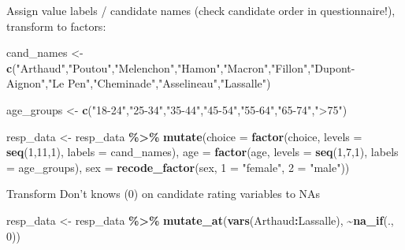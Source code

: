 \documentclass[
]{article}
\newenvironment{Shaded}{\begin{snugshade}}{\end{snugshade}}
\newcommand{\AttributeTok}[1]{\textcolor[rgb]{0.13,0.29,0.53}{#1}}
\newcommand{\DecValTok}[1]{\textcolor[rgb]{0.00,0.00,0.81}{#1}}
\newcommand{\FunctionTok}[1]{\textcolor[rgb]{0.13,0.29,0.53}{\textbf{#1}}}
\newcommand{\NormalTok}[1]{#1}
\newcommand{\OtherTok}[1]{\textcolor[rgb]{0.56,0.35,0.01}{#1}}
\newcommand{\SpecialCharTok}[1]{\textcolor[rgb]{0.81,0.36,0.00}{\textbf{#1}}}
\newcommand{\StringTok}[1]{\textcolor[rgb]{0.31,0.60,0.02}{#1}}
\begin{document}
Assign value labels / candidate names (check candidate order in
questionnaire!), transform to factors:

\begin{Shaded}
\begin{Highlighting}[]
\NormalTok{cand\_names }\OtherTok{\textless{}{-}} \FunctionTok{c}\NormalTok{(}\StringTok{"Arthaud"}\NormalTok{,}\StringTok{"Poutou"}\NormalTok{,}\StringTok{"Melenchon"}\NormalTok{,}\StringTok{"Hamon"}\NormalTok{,}\StringTok{"Macron"}\NormalTok{,}\StringTok{"Fillon"}\NormalTok{,}\StringTok{"Dupont{-}Aignon"}\NormalTok{,}\StringTok{"Le Pen"}\NormalTok{,}\StringTok{"Cheminade"}\NormalTok{,}\StringTok{"Asselineau"}\NormalTok{,}\StringTok{"Lassalle"}\NormalTok{)}

\NormalTok{age\_groups }\OtherTok{\textless{}{-}} \FunctionTok{c}\NormalTok{(}\StringTok{"18{-}24"}\NormalTok{,}\StringTok{"25{-}34"}\NormalTok{,}\StringTok{"35{-}44"}\NormalTok{,}\StringTok{"45{-}54"}\NormalTok{,}\StringTok{"55{-}64"}\NormalTok{,}\StringTok{"65{-}74"}\NormalTok{,}\StringTok{"\textgreater{}75"}\NormalTok{)}

\NormalTok{resp\_data }\OtherTok{\textless{}{-}}\NormalTok{ resp\_data }\SpecialCharTok{\%\textgreater{}\%} \FunctionTok{mutate}\NormalTok{(}\AttributeTok{choice =} \FunctionTok{factor}\NormalTok{(choice, }\AttributeTok{levels =} \FunctionTok{seq}\NormalTok{(}\DecValTok{1}\NormalTok{,}\DecValTok{11}\NormalTok{,}\DecValTok{1}\NormalTok{), }\AttributeTok{labels =}\NormalTok{ cand\_names), }\AttributeTok{age =} \FunctionTok{factor}\NormalTok{(age, }\AttributeTok{levels =} \FunctionTok{seq}\NormalTok{(}\DecValTok{1}\NormalTok{,}\DecValTok{7}\NormalTok{,}\DecValTok{1}\NormalTok{), }\AttributeTok{labels =}\NormalTok{ age\_groups), }\AttributeTok{sex =} \FunctionTok{recode\_factor}\NormalTok{(sex, }\StringTok{\textasciigrave{}}\AttributeTok{1}\StringTok{\textasciigrave{}} \OtherTok{=} \StringTok{"female"}\NormalTok{, }\StringTok{\textasciigrave{}}\AttributeTok{2}\StringTok{\textasciigrave{}} \OtherTok{=} \StringTok{"male"}\NormalTok{))}
\end{Highlighting}
\end{Shaded}

Transform Don't knows (0) on candidate rating variables to NAs

\begin{Shaded}
\begin{Highlighting}[]
\NormalTok{resp\_data }\OtherTok{\textless{}{-}}\NormalTok{ resp\_data }\SpecialCharTok{\%\textgreater{}\%}
  \FunctionTok{mutate\_at}\NormalTok{(}\FunctionTok{vars}\NormalTok{(Arthaud}\SpecialCharTok{:}\NormalTok{Lassalle), }\SpecialCharTok{\textasciitilde{}}\FunctionTok{na\_if}\NormalTok{(., }\DecValTok{0}\NormalTok{))}
\end{Highlighting}
\end{Shaded}
\end{document}
